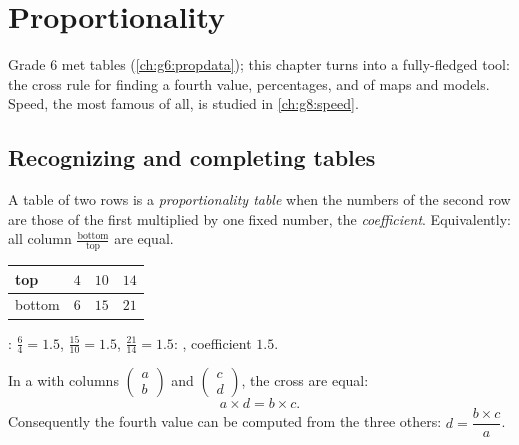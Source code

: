 \chapter{Proportionality}\label{ch:g7:prop}

Grade 6 met  tables (\cref{ch:g6:propdata}); this chapter
turns  into a fully-fledged tool: the cross rule for
finding a fourth value, percentages, and  of maps and models.
Speed, the most famous  of all, is studied in
\cref{ch:g8:speed}.

\section{Recognizing and completing tables}

\begin{definition}\label{def:g7:prop:table}
A table of two rows is a \emph{proportionality
table} when the numbers of the second row are
those of the first multiplied by one fixed number, the
\emph{coefficient}. Equivalently: all column 
$\frac{\text{bottom}}{\text{top}}$ are equal.
\end{definition}

\begin{example}\label{ex:g7:prop:recognize}
\begin{center}
\renewcommand{\arraystretch}{1.3}
\begin{tabular}{l|ccc}
top & $4$ & $10$ & $14$ \\
\hline
bottom & $6$ & $15$ & $21$ \\
\end{tabular}
\end{center}
: $\frac64 = 1.5$, $\frac{15}{10} = 1.5$,
$\frac{21}{14} = 1.5$: , coefficient $1.5$.
\end{example}

\begin{theorem}\label{thm:g7:prop:cross}
In a  with columns $\begin{pmatrix} a \\ b
\end{pmatrix}$ and $\begin{pmatrix} c \\ d \end{pmatrix}$, the cross
 are equal:
\[
a \times d = b \times c .
\]
Consequently the fourth value can be computed from the three others:
$d = \dfrac{b \times c}{a}$.
\end{theorem}

